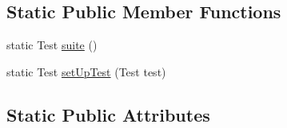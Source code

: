 \subsection*{Static Public Member Functions}
\begin{DoxyCompactItemize}
\item 
static Test \hyperlink{classedu_1_1illinois_1_1canistelCassabanana_1_1tests_1_1RemoveDuplicateCodeInConstructorsRefactoringTests_aa4dbfb99e813da80d6a7315bb6229ec1}{suite} ()
\item 
static Test \hyperlink{classedu_1_1illinois_1_1canistelCassabanana_1_1tests_1_1RemoveDuplicateCodeInConstructorsRefactoringTests_ab5b5ba61d920f31a03d1717be728be07}{setUpTest} (Test test)
\end{DoxyCompactItemize}
\subsection*{Static Public Attributes}
